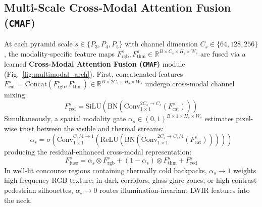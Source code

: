 \documentclass[journal,twoside,web]{ieeecolor}
\begin{document}
\subsection{Multi-Scale Cross-Modal Attention Fusion (\texttt{CMAF})}
At each pyramid scale $s \in \{P_3, P_4, P_5\}$ with channel dimension $C_s \in \{64, 128, 256\}$, the modality-specific feature maps $F_{\text{rgb}}^s, F_{\text{thm}}^s \in \mathbb{R}^{B \times C_s \times H_s \times W_s}$ are fused via a learned \textbf{Cross-Modal Attention Fusion (\texttt{CMAF})} module (Fig.~\ref{fig:multimodal_arch}). First, concatenated features $F_{\text{cat}}^s = \mathrm{Concat}\!\left(F_{\text{rgb}}^s, F_{\text{thm}}^s\right) \in \mathbb{R}^{B \times 2C_s \times H_s \times W_s}$ undergo cross-modal channel mixing:
\begin{equation}
F_{\text{red}}^s = \mathrm{SiLU}\!\left(\mathrm{BN}\!\left(\mathrm{Conv}_{1\times 1}^{2C_s \rightarrow C_s}(F_{\text{cat}}^s)\right)\right)
\label{eq:cmaf_reduce}
\end{equation}
Simultaneously, a spatial modality gate $\alpha_s \in (0, 1)^{B \times 1 \times H_s \times W_s}$ estimates pixel-wise trust between the visible and thermal streams:
\begin{equation}
\alpha_s = \sigma\!\left(\mathrm{Conv}_{1\times 1}^{C_s/4 \rightarrow 1}\!\left(\mathrm{ReLU}\!\left(\mathrm{BN}\!\left(\mathrm{Conv}_{1\times 1}^{2C_s \rightarrow C_s/4}(F_{\text{cat}}^s)\right)\right)\right)\right)
\label{eq:cmaf_gate}
\end{equation}
producing the residual-enhanced cross-modal representation:
\begin{equation}
F_{\text{fuse}}^s = \alpha_s \otimes F_{\text{rgb}}^s + (1 - \alpha_s) \otimes F_{\text{thm}}^s + F_{\text{red}}^s
\label{eq:cmaf_out}
\end{equation}
In well-lit concourse regions containing thermally cold backpacks, $\alpha_s \rightarrow 1$ weights high-frequency RGB texture; in dark corridors, glass glare zones, or high-contrast pedestrian silhouettes, $\alpha_s \rightarrow 0$ routes illumination-invariant LWIR features into the neck.
\end{document}
